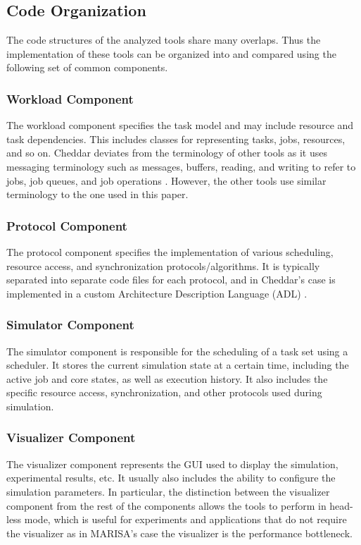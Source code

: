 \documentclass[conference,compsoc]{IEEEtran}
\begin{document}
\subsection{Code Organization}
The code structures of the analyzed tools share many overlaps. Thus the implementation of these tools can be organized into and compared using the following set of common components.

\subsubsection{Workload Component} The workload component specifies the task model and may include resource and task dependencies. This includes classes for representing tasks, jobs, resources, and so on. Cheddar deviates from the terminology of other tools as it uses messaging terminology such as messages, buffers, reading, and writing to refer to jobs, job queues, and job operations \cite{cheddar_paper}. However, the other tools use similar terminology to the one used in this paper.

\subsubsection{Protocol Component} The protocol component specifies the implementation of various scheduling, resource access, and synchronization protocols/algorithms. It is typically separated into separate code files for each protocol, and in Cheddar's case is implemented in a custom Architecture Description Language (ADL) \cite{cheddar_docs}.

\subsubsection{Simulator Component} The simulator component is responsible for the scheduling of a task set using a scheduler. It stores the current simulation state at a certain time, including the active job and core states, as well as execution history. It also includes the specific resource access, synchronization, and other protocols used during simulation.

\subsubsection{Visualizer Component} The visualizer component represents the GUI used to display the simulation, experimental results, etc. It usually also includes the ability to configure the simulation parameters. In particular, the distinction between the visualizer component from the rest of the components allows the tools to perform in head-less mode, which is useful for experiments and applications that do not require the visualizer as in MARISA's case the visualizer is the performance bottleneck.
\end{document}
